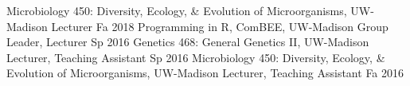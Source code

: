 

\begin{cvhonors}
  \cvhonor
    {Microbiology 450: Diversity, Ecology, \& Evolution of Microorganisms, UW-Madison}
    {Lecturer}
    {Fa 2018}
  \cvhonor
    {Programming in R, ComBEE, UW-Madison}
    {Group Leader, Lecturer}
    {Sp 2016}
  \cvhonor
    {Genetics 468: General Genetics II, UW-Madison}
    {Lecturer, Teaching Assistant}
    {Sp 2016}
  \cvhonor
    {Microbiology 450: Diversity, Ecology, \& Evolution of Microorganisms, UW-Madison}
    {Lecturer, Teaching Assistant}
    {Fa 2016}
\end{cvhonors}